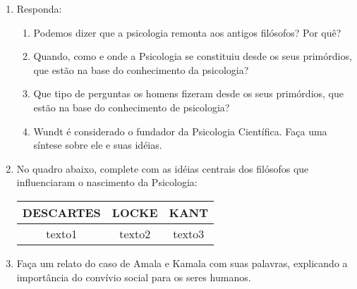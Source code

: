 \documentclass[a4paper, 12pt]{article}
\begin{document}
 \begin{enumerate}
  
   \item Responda:
     \begin{enumerate}
      \item Podemos dizer que a psicologia remonta aos antigos filósofos? Por quê?
      \item Quando, como e onde a Psicologia se constituiu desde os seus primórdios, que estão na base do conhecimento da psicologia?
      \item Que tipo de perguntas os homens fizeram desde os seus primórdios, que estão na base do conhecimento de psicologia?
      \item Wundt é considerado o fundador da Psicologia Científica. Faça uma síntese sobre ele e suas idéias.
     \end{enumerate}

   \item No quadro abaixo, complete com as idéias centrais dos filósofos que influenciaram o nascimento da Psicologia: \newline \newline
     \centering
     \begin{tabular}{|c|c|c|}
     \hline
     \textbf{DESCARTES} & \textbf{LOCKE} & \textbf{KANT} \\ \hline
     texto1 & texto2 & texto3 \\ \hline
     \end{tabular} \newline
     
   \item Faça um relato do caso de Amala e Kamala com suas palavras, explicando a importância do convívio social para os seres humanos.
 \end{enumerate}
 
\end{document}
